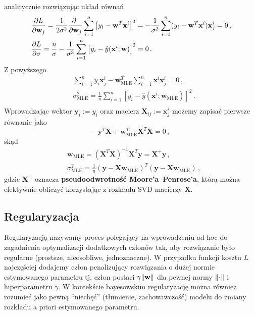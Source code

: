\documentclass{myclass}
\numberwithin{equation}{subsection}
\begin{document}
analitycznie rozwiązując układ równań
\begin{equation}
    \begin{split}
        &\pdv{L}{\mathbf{w}_j} = \frac{1}{2\sigma^2}\pdv{~}{\mathbf{w}_j}\sum_{i=1}^n\left[y_i - \mathbf{w}^T\mathbf{x}^i\right]^2 = -\frac{1}{\sigma^2}\sum_{i=1}^n (y_i - \mathbf{w}^T\mathbf{x}^i)\mathbf{x}^i_j = 0\,,\\
        &\pdv{L}{\sigma} = \frac{n}{\sigma} - \frac{1}{\sigma^3}\sum_{i=1}^n \left[y_i - \hat{y}(\mathbf{x}^i; \mathbf{w})\right]^2 = 0\,.
    \end{split}
\end{equation}
Z powyższego
\begin{equation}
    \begin{split}
        &\sum_{i=1}^n y_i\mathbf{x}^i_j - \mathbf{w}_\mathrm{MLE}^T\sum_{i=1}^n\mathbf{x}^i\mathbf{x}^i_j = 0\,,\\
        &\sigma_\mathrm{MLE}^2 = \frac{1}{n} \sum_{i=1}^n \left[y_i - \hat{y}(\mathbf{x}^i; \mathbf{w}_\mathrm{MLE})\right]^2\,.\\
    \end{split}
\end{equation}
Wprowadzając wektor \(\mathbf{y}_i := y_i\) oraz macierz \(\mathbf{X}_{ij} := \mathbf{x}^i_j\) możemy
zapisać pierwsze równanie jako
\begin{equation}
    -\mathbf{y}^T\mathbf{X} + \mathbf{w}^T_\mathrm{MLE} \mathbf{X}^T\mathbf{X} = 0\,,
\end{equation}
skąd
\begin{equation}\boxed{
    \begin{split}
        &\mathbf{w}_\mathrm{MLE} = \left(\mathbf{X}^T\mathbf{X}\right)^{-1}\mathbf{X}^T\mathbf{y} = \mathbf{X}^+\mathbf{y}\,,\\
        &\sigma_\mathrm{MLE}^2 = \frac{1}{n}\left(\mathbf{y} - \mathbf{X}\mathbf{w}_\mathrm{MLE}\right)^T\left(\mathbf{y} - \mathbf{X}\mathbf{w}_\mathrm{MLE}\right)\,,
    \end{split}
}\end{equation}
gdzie \(\mathbf{X}^+\) oznacza \textbf{pseudoodwrotność Moore'a--Penrose'a}, którą można efektywnie
obliczyć korzystając z rozkładu SVD macierzy \(\mathbf{X}\).


\subsection{Regularyzacja}

Regularyzacją  nazywamy proces polegający na wprowadzeniu ad hoc do zagadnienia optymalizacji
dodatkowych członów tak, aby rozwiązanie było regularne (prostsze, nieosobliwe, jednoznaczne). W
przypadku funkcji kosztu \(L\) najczęściej dodajemy człon penalizujący rozwiązania o dużej normie
estymowanego parametru tj. człon postaci \(\gamma \norm{\mathbf{w}}\) dla pewnej normy
\(\norm{\cdot}\) i hiperparametru \(\gamma\). W kontekście bayesowskim regularyzację można również
rozumieć jako pewną \enquote{niechęć} (tłumienie, zachowawczość) modelu do zmiany rozkładu a priori
estymowanego parametru.
\end{document}
